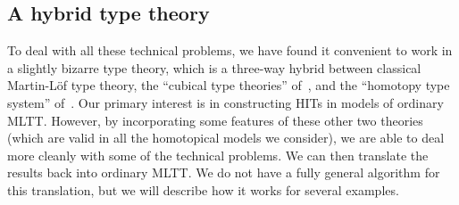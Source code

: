 \documentclass{amsart}
\begin{document}
\subsection{A hybrid type theory}
\label{sec:hybrid-tt}

To deal with all these technical problems, we have found it convenient to work in a slightly bizarre type theory, which is a three-way hybrid between classical Martin-L\"of type theory, the ``cubical type theories'' of~\cite{bch:tt-cubical,ak:cubical,lb:cubical-tt}, and the ``homotopy type system'' of~\cite{vv:hts}.
Our primary interest is in constructing HITs in models of ordinary MLTT.
However, by incorporating some features of these other two theories (which are valid in all the homotopical models we consider), we are able to deal more cleanly with some of the technical problems.
We can then translate the results back into ordinary MLTT.
We do not have a fully general algorithm for this translation, but we will describe how it works for several examples.
\end{document}
